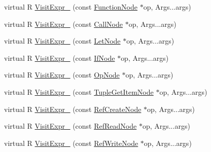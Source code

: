 \begin{DoxyCompactItemize}
\item 
virtual R \hyperlink{classtvm_1_1relay_1_1ExprFunctor_3_01R_07const_01Expr_01_6n_00_01Args_8_8_8_08_4_a09a9c1f906e909919b4cacf4b5659c0c}{Visit\+Expr\+\_\+} (const \hyperlink{classtvm_1_1relay_1_1FunctionNode}{Function\+Node} $\ast$op, Args...\+args)
\item 
virtual R \hyperlink{classtvm_1_1relay_1_1ExprFunctor_3_01R_07const_01Expr_01_6n_00_01Args_8_8_8_08_4_a01944342a92438a13418ab39135ef23a}{Visit\+Expr\+\_\+} (const \hyperlink{classtvm_1_1relay_1_1CallNode}{Call\+Node} $\ast$op, Args...\+args)
\item 
virtual R \hyperlink{classtvm_1_1relay_1_1ExprFunctor_3_01R_07const_01Expr_01_6n_00_01Args_8_8_8_08_4_a19256b27e03264c09868bd5cdfb93f3f}{Visit\+Expr\+\_\+} (const \hyperlink{classtvm_1_1relay_1_1LetNode}{Let\+Node} $\ast$op, Args...\+args)
\item 
virtual R \hyperlink{classtvm_1_1relay_1_1ExprFunctor_3_01R_07const_01Expr_01_6n_00_01Args_8_8_8_08_4_af221c096d7aff8314f914fcb085cf423}{Visit\+Expr\+\_\+} (const \hyperlink{classtvm_1_1relay_1_1IfNode}{If\+Node} $\ast$op, Args...\+args)
\item 
virtual R \hyperlink{classtvm_1_1relay_1_1ExprFunctor_3_01R_07const_01Expr_01_6n_00_01Args_8_8_8_08_4_a0e7ea6a2c4ecc8ba4381837e5466e9a1}{Visit\+Expr\+\_\+} (const \hyperlink{namespacetvm_1_1relay_ac9d4f2cf78a48659817a88d890e1d142}{Op\+Node} $\ast$op, Args...\+args)
\item 
virtual R \hyperlink{classtvm_1_1relay_1_1ExprFunctor_3_01R_07const_01Expr_01_6n_00_01Args_8_8_8_08_4_a43baf8c1149f7c54d59526aba017f658}{Visit\+Expr\+\_\+} (const \hyperlink{classtvm_1_1relay_1_1TupleGetItemNode}{Tuple\+Get\+Item\+Node} $\ast$op, Args...\+args)
\item 
virtual R \hyperlink{classtvm_1_1relay_1_1ExprFunctor_3_01R_07const_01Expr_01_6n_00_01Args_8_8_8_08_4_ac1b7b83be73f45d30d7d20e76212a944}{Visit\+Expr\+\_\+} (const \hyperlink{classtvm_1_1relay_1_1RefCreateNode}{Ref\+Create\+Node} $\ast$op, Args...\+args)
\item 
virtual R \hyperlink{classtvm_1_1relay_1_1ExprFunctor_3_01R_07const_01Expr_01_6n_00_01Args_8_8_8_08_4_a36a41b449a6c40291527bb51797b71db}{Visit\+Expr\+\_\+} (const \hyperlink{classtvm_1_1relay_1_1RefReadNode}{Ref\+Read\+Node} $\ast$op, Args...\+args)
\item 
virtual R \hyperlink{classtvm_1_1relay_1_1ExprFunctor_3_01R_07const_01Expr_01_6n_00_01Args_8_8_8_08_4_a9f5d2e1833e515dce36d29ef2781cc1f}{Visit\+Expr\+\_\+} (const \hyperlink{classtvm_1_1relay_1_1RefWriteNode}{Ref\+Write\+Node} $\ast$op, Args...\+args)

\end{DoxyCompactItemize}
